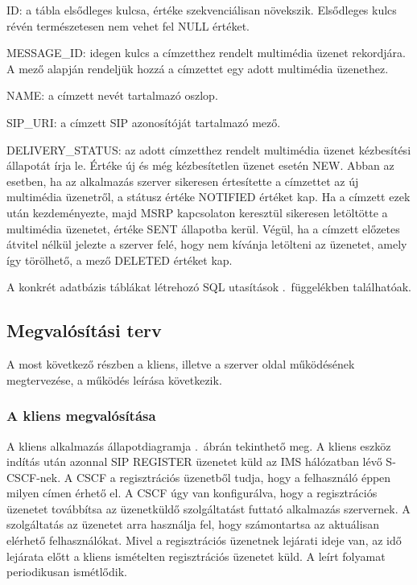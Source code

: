 \begin{mydescription}
\item[ID:] a tábla elsődleges kulcsa, értéke szekvenciálisan növekszik. Elsődleges kulcs révén természetesen nem vehet fel NULL értéket.
\item[MESSAGE\_ID:] idegen kulcs a címzetthez rendelt multimédia üzenet rekordjára. A mező alapján rendeljük hozzá a címzettet egy adott multimédia üzenethez.
\item[NAME:]  a címzett nevét tartalmazó oszlop.
\item[SIP\_URI:] a címzett SIP azonosítóját tartalmazó mező.
\item[DELIVERY\_STATUS:] az adott címzetthez rendelt multimédia üzenet kézbesítési állapotát írja le. Értéke új és még kézbesítetlen üzenet esetén NEW. Abban az esetben, ha az alkalmazás szerver sikeresen értesítette a címzettet az új multimédia üzenetről, a státusz értéke NOTIFIED értéket kap. Ha a címzett ezek után kezdeményezte, majd MSRP kapcsolaton keresztül sikeresen letöltötte a multimédia üzenetet, értéke SENT állapotba kerül. Végül, ha a címzett előzetes átvitel nélkül jelezte a szerver felé, hogy nem kívánja letölteni az üzenetet, amely így törölhető, a mező DELETED értéket kap.
\end{mydescription}

A konkrét adatbázis táblákat létrehozó SQL utasítások .~függelékben találhatóak.

\medskip

\subsection{Megvalósítási terv}
\label{sec:megvalositas}

A most következő részben a kliens, illetve a szerver oldal működésének megtervezése, a működés leírása következik.

\subsubsection{A kliens megvalósítása}
\label{sec:kliensmegvalositas}

A kliens alkalmazás állapotdiagramja .~ábrán tekinthető meg. A kliens eszköz indítás után azonnal SIP REGISTER üzenetet küld az IMS hálózatban lévő S-CSCF-nek. A CSCF a  regisztrációs üzenetből tudja, hogy a felhasználó éppen milyen címen érhető el. A CSCF úgy van konfigurálva, hogy a regisztrációs üzenetet továbbítsa az üzenetküldő szolgáltatást futtató alkalmazás szervernek. A szolgáltatás az üzenetet arra használja fel, hogy számontartsa az aktuálisan elérhető felhasználókat. Mivel a regisztrációs üzenetnek lejárati ideje van, az idő lejárata előtt a kliens ismételten regisztrációs üzenetet küld. A leírt folyamat periodikusan ismétlődik.


